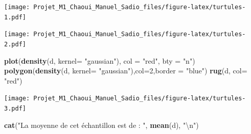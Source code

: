 \documentclass[
]{book}
\newenvironment{Shaded}{\begin{snugshade}}{\end{snugshade}}
\newcommand{\CharTok}[1]{\textcolor[rgb]{0.31,0.60,0.02}{#1}}
\newcommand{\CommentTok}[1]{\textcolor[rgb]{0.56,0.35,0.01}{\textit{#1}}}
\newcommand{\DataTypeTok}[1]{\textcolor[rgb]{0.13,0.29,0.53}{#1}}
\newcommand{\DecValTok}[1]{\textcolor[rgb]{0.00,0.00,0.81}{#1}}
\newcommand{\KeywordTok}[1]{\textcolor[rgb]{0.13,0.29,0.53}{\textbf{#1}}}
\newcommand{\NormalTok}[1]{#1}
\newcommand{\OperatorTok}[1]{\textcolor[rgb]{0.81,0.36,0.00}{\textbf{#1}}}
\newcommand{\StringTok}[1]{\textcolor[rgb]{0.31,0.60,0.02}{#1}}
\begin{document}
\texttt{[image: Projet\_M1\_Chaoui\_Manuel\_Sadio\_files/figure-latex/turtules-1.pdf]}

\begin{Shaded}
\end{Shaded}

\texttt{[image: Projet\_M1\_Chaoui\_Manuel\_Sadio\_files/figure-latex/turtules-2.pdf]}

\begin{Shaded}
\begin{Highlighting}[]
\KeywordTok{plot}\NormalTok{(}\KeywordTok{density}\NormalTok{(d, }\DataTypeTok{kernel=} \StringTok{"gaussian"}\NormalTok{), }\DataTypeTok{col =} \StringTok{"red"}\NormalTok{, }\DataTypeTok{bty =} \StringTok{"n"}\NormalTok{)}
\KeywordTok{polygon}\NormalTok{(}\KeywordTok{density}\NormalTok{(d, }\DataTypeTok{kernel=} \StringTok{"gaussian"}\NormalTok{),}\DataTypeTok{col=}\DecValTok{2}\NormalTok{,}\DataTypeTok{border =} \StringTok{"blue"}\NormalTok{)}
\KeywordTok{rug}\NormalTok{(d, }\DataTypeTok{col=} \StringTok{"red"}\NormalTok{)}
\end{Highlighting}
\end{Shaded}

\texttt{[image: Projet\_M1\_Chaoui\_Manuel\_Sadio\_files/figure-latex/turtules-3.pdf]}

\begin{Shaded}
\begin{Highlighting}[]
\KeywordTok{cat}\NormalTok{(}\StringTok{"La moyenne de cet échantillon est de : "}\NormalTok{, }\KeywordTok{mean}\NormalTok{(d), }\StringTok{"}\CharTok{\textbackslash{}n}\StringTok{"}\NormalTok{)}
\end{Highlighting}
\end{Shaded}
\end{document}
